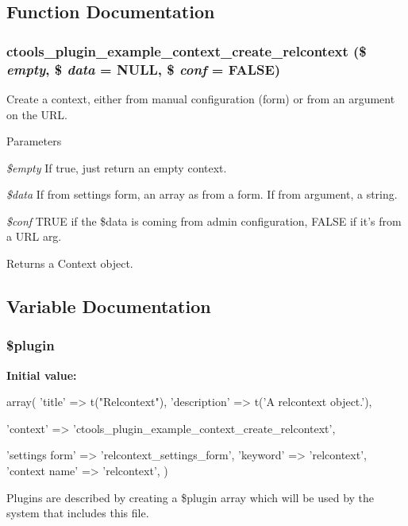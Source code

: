 \subsection{Function Documentation}
\hypertarget{relcontext_8inc_a2956388149c8e389a959757769f67767}{
\subsubsection[{ctools\_\-plugin\_\-example\_\-context\_\-create\_\-relcontext}]{\setlength{\rightskip}{0pt plus 5cm}ctools\_\-plugin\_\-example\_\-context\_\-create\_\-relcontext (\$ {\em empty}, \/  \$ {\em data} = {\ttfamily NULL}, \/  \$ {\em conf} = {\ttfamily FALSE})}}
\label{relcontext_8inc_a2956388149c8e389a959757769f67767}
Create a context, either from manual configuration (form) or from an argument on the URL.


\begin{DoxyParams}{Parameters}
\item[{\em \$empty}]If true, just return an empty context. \item[{\em \$data}]If from settings form, an array as from a form. If from argument, a string. \item[{\em \$conf}]TRUE if the \$data is coming from admin configuration, FALSE if it's from a URL arg.\end{DoxyParams}
\begin{DoxyReturn}{Returns}
a Context object. 
\end{DoxyReturn}


\subsection{Variable Documentation}
\hypertarget{relcontext_8inc_ada8a7130088351710bb02ed622d6bf65}{
\subsubsection[{\$plugin}]{\setlength{\rightskip}{0pt plus 5cm}\$plugin}}
\label{relcontext_8inc_ada8a7130088351710bb02ed622d6bf65}
{\bfseries Initial value:}
\begin{DoxyCode}
 array(
  'title' => t("Relcontext"),
  'description' => t('A relcontext object.'),
  
  'context' => 'ctools_plugin_example_context_create_relcontext',
  
  'settings form' => 'relcontext_settings_form',
  'keyword' => 'relcontext',
  'context name' => 'relcontext',
)
\end{DoxyCode}
Plugins are described by creating a \$plugin array which will be used by the system that includes this file. 